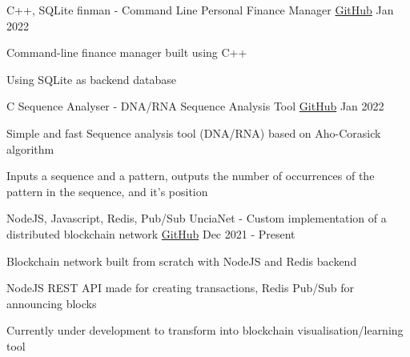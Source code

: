 \begin{cventries}

  \cventry
  {C++, SQLite}
  {finman - Command Line Personal Finance Manager}
  {\href{https://github.com/UnciaBit/finman}{GitHub}} %
  {Jan 2022}
  {
    \begin{cvitems}
      \item {Command-line finance manager built using C++}
      \item {Using SQLite as backend database}
    \end{cvitems}
  }

  \cventry
  {C}
  {Sequence Analyser - DNA/RNA Sequence Analysis Tool}
  {\href{https://github.com/UnciaBit/Sequence-Analysis}{GitHub}} %
  {Jan 2022}
  {
    \begin{cvitems}
      \item {Simple and fast Sequence analysis tool (DNA/RNA) based on Aho-Corasick algorithm}
      \item {Inputs a sequence and a pattern, outputs the number of occurrences of the pattern in the sequence, and it's position}
    \end{cvitems}
  }



  \cventry
  {NodeJS, Javascript, Redis, Pub/Sub}
  {UnciaNet - Custom implementation of a distributed blockchain network}
  {\href{https://github.com/UnciaBit/UnciaNet-FE}{GitHub}} %
  {Dec 2021 - Present}
  {
    \begin{cvitems}
      \item {Blockchain network built from scratch with NodeJS and Redis backend}
      \item {NodeJS REST API made for creating transactions, Redis Pub/Sub for announcing blocks}
      \item {Currently under development to transform into blockchain visualisation/learning tool}
    \end{cvitems}
  }



\end{cventries}
